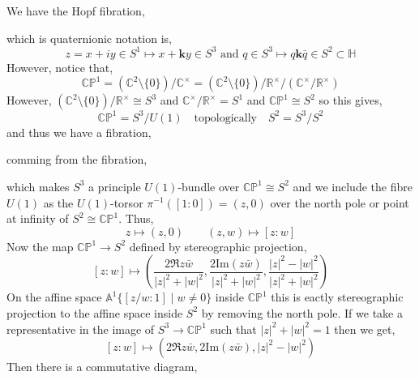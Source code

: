 \documentclass[12pt]{extarticle}
\newcommand{\R}{\mathbb{R}}
\renewcommand{\Im}[1]{\mathrm{Im}(#1)}
\theoremstyle{definition}
\renewcommand{\bf}[1]{\mathbf{#1}}
\newcommand{\C}{\mathbb{C}}
\renewcommand{\H}{\mathbb{H}}
\newcommand{\CP}{\mathbb{CP}}
\newcommand{\A}{\mathbb{A}}
\begin{document}
We have the Hopf fibration,
\begin{center}
\end{center}
which is quaternionic notation is,
\[ z =  x + i y \in S^1 \mapsto x + \bf{k} y \in S^3 \text{ and } q \in S^3 \mapsto q \bf{k} \bar{q} \in S^2 \subset \H \]
However, notice that,
\[ \CP^1 = (\C^2 \setminus \{ 0 \}) / \C^\times = (\C^2 \setminus \{ 0 \})/\R^\times /(\C^\times / \R^\times) \]
However, $(\C^2 \setminus \{ 0 \})/\R^\times \cong S^3$ and $\C^\times / \R^\times = S^1$ and $\CP^1 \cong S^2$ so this gives,
\[ \CP^1 = S^3 / U(1) \quad \text{topologically} \quad S^2 = S^3 / S^2 \]
and thus we have a fibration,
\begin{center}
\end{center}
comming from the fibration,
\begin{center}
\end{center}
which makes $S^3$ a principle $U(1)$-bundle over $\CP^1 \cong S^2$ and we include the fibre $U(1)$ as the $U(1)$-torsor $\pi^{-1}([1 : 0]) = (z, 0)$ over the north pole or point at infinity of $S^2 \cong \CP^1$. Thus,
\[ z \mapsto (z, 0) \quad \quad (z, w) \mapsto [z : w] \]
Now the map $\CP^1 \to S^2$ defined by stereographic projection,
\[ [z : w] \mapsto \left( \frac{2 \Re{z \bar{w}}}{|z|^2 + |w|^2}, \frac{2 \Im{z \bar{w}}}{|z|^2 + |w|^2}, \frac{|z|^2 - |w|^2}{|z|^2 + |w|^2} \right) \]
On the affine space $\A^1 \{ [ z / w : 1 ] \mid w \neq 0 \}$ inside $\CP^1$ this is eactly stereographic projection to the affine space inside $S^2$ by removing the north pole. 
If we take a representative in the image of $S^3 \to \CP^1$ such that $|z|^2 + |w|^2 = 1$ then we get,
\[ [z : w] \mapsto \left( 2 \Re{z \bar{w}}, 2 \Im{z \bar{w}},  |z|^2 - |w|^2 \right) \]
Then there is a commutative diagram,
\begin{center}
\end{center}
\end{document}
